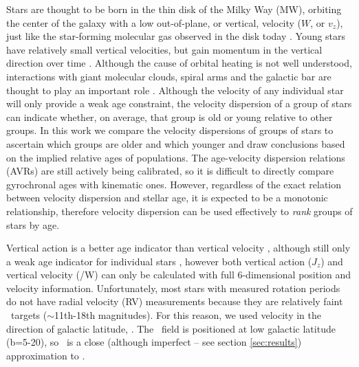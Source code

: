 Stars are thought to be born in the thin disk of the Milky Way (MW), orbiting
the center of the galaxy with a low out-of-plane, or vertical, velocity ($W$,
or $v_z$), just like the star-forming molecular gas observed in the disk today
\citep[\eg][]{stark1989, stark2005, aumer2009, martig2014, aumer2016}.
Young stars have relatively small vertical velocities, but gain momentum in
the vertical direction over time \citep[\eg][]{nordstrom2004, holmberg2007,
holmberg2009, aumer2009, casagrande2011}.
Although the cause of orbital heating is not well understood, interactions
with giant molecular clouds, spiral arms and the galactic bar are thought to
play an important role \citep[see][for a review of secular evolution in the
MW]{sellwood2014}.
Although the velocity of any individual star will only provide a weak age
constraint, the velocity dispersion of a group of stars can indicate whether,
on average, that group is old or young relative to other groups.
In this work we compare the velocity dispersions of groups of stars to
ascertain which groups are older and which younger and draw conclusions based
on the implied relative ages of populations.
The age-velocity dispersion relations (AVRs) are still actively being
calibrated, so it is difficult to directly compare gyrochronal ages with
kinematic ones.
However, regardless of the exact relation between velocity dispersion and
stellar age, it is expected to be a monotonic relationship, therefore velocity
dispersion can be used effectively to {\it rank} groups of stars by age.

Vertical action is a better age indicator than vertical velocity
\citep{ting2019}, although still only a weak age indicator for individual
stars \citep{beane2018}, however both vertical action ($J_z$) and vertical
velocity (\vz/W) can only be calculated with full 6-dimensional position and
velocity information.
Unfortunately, most stars with measured rotation periods do not have radial
velocity (RV) measurements because they are relatively faint \kepler\ targets
($\sim$11th-18th magnitudes).
For this reason, we used velocity in the direction of galactic latitude, \vb.
The \kepler\ field is positioned at low galactic latitude (b=5-20\degrees), so
\vb\ is a close (although imperfect -- see section \ref{sec:results})
approximation to \vz.

